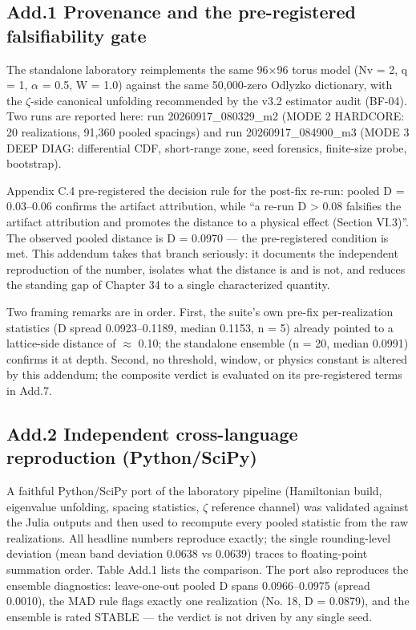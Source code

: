 \documentclass[10pt]{article}
\begin{document}
\subsection{Add.1 Provenance and the pre-registered falsifiability gate}


The standalone laboratory reimplements the same 96$\times$96 torus model (Nv = 2, q = 1, $\alpha$ = 0.5, W = 1.0) against the same 50,000-zero Odlyzko dictionary, with the $\zeta$-side canonical unfolding recommended by the v3.2 estimator audit (BF-04). Two runs are reported here: run 20260917\_080329\_m2 (MODE 2 HARDCORE: 20 realizations, 91,360 pooled spacings) and run 20260917\_084900\_m3 (MODE 3 DEEP DIAG: differential CDF, short-range zone, seed forensics, finite-size probe, bootstrap).


Appendix C.4 pre-registered the decision rule for the post-fix re-run: pooled D = 0.03--0.06 confirms the artifact attribution, while ``a re-run D > 0.08 falsifies the artifact attribution and promotes the distance to a physical effect (Section VI.3)''. The observed pooled distance is D = 0.0970 --- the pre-registered condition is met. This addendum takes that branch seriously: it documents the independent reproduction of the number, isolates what the distance is and is not, and reduces the standing gap of Chapter 34 to a single characterized quantity.


Two framing remarks are in order. First, the suite's own pre-fix per-realization statistics (D spread 0.0923--0.1189, median 0.1153, n = 5) already pointed to a lattice-side distance of $\approx$ 0.10; the standalone ensemble (n = 20, median 0.0991) confirms it at depth. Second, no threshold, window, or physics constant is altered by this addendum; the composite verdict is evaluated on its pre-registered terms in Add.7.


\subsection{Add.2 Independent cross-language reproduction (Python/SciPy)}


A faithful Python/SciPy port of the laboratory pipeline (Hamiltonian build, eigenvalue unfolding, spacing statistics, $\zeta$ reference channel) was validated against the Julia outputs and then used to recompute every pooled statistic from the raw realizations. All headline numbers reproduce exactly; the single rounding-level deviation (mean band deviation 0.0638 vs 0.0639) traces to floating-point summation order. Table Add.1 lists the comparison. The port also reproduces the ensemble diagnostics: leave-one-out pooled D spans 0.0966--0.0975 (spread 0.0010), the MAD rule flags exactly one realization (No. 18, D = 0.0879), and the ensemble is rated STABLE --- the verdict is not driven by any single seed.
\end{document}
